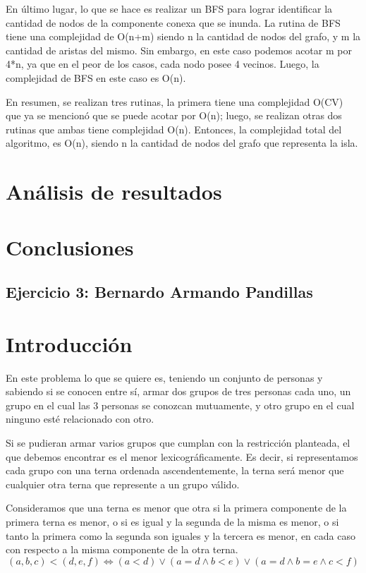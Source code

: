 \documentclass[a4paper, 12pt]{article}
\begin{document}
En \'ultimo lugar, lo que se hace es realizar un BFS para lograr identificar la cantidad de nodos de la componente conexa que se inunda. La rutina de BFS tiene una complejidad de O(n+m) siendo n la cantidad de nodos del grafo, y m la cantidad de aristas del mismo. Sin embargo, en este caso podemos acotar m por 4*n, ya que en el peor de los casos, cada nodo posee 4 vecinos. Luego, la complejidad de BFS en este caso es O(n).

En resumen, se realizan tres rutinas, la primera tiene una complejidad O(CV) que ya se mencion\'o que se puede acotar por O(n); luego, se realizan otras dos rutinas que ambas tiene complejidad O(n). Entonces, la complejidad total del algoritmo, es O(n), siendo n la cantidad de nodos del grafo que representa la isla.

\section*{An\'alisis de resultados}
\section*{Conclusiones}

\begin{center}
\item \section*{Ejercicio 3: Bernardo Armando Pandillas}
\end{center}

\section*{Introducci\'on}


En este problema lo que se quiere es, teniendo un conjunto de personas y sabiendo si se conocen entre s\'i, armar dos grupos de tres personas cada uno, un grupo en el cual las 3 personas se conozcan mutuamente, y otro grupo en el cual ninguno est\'e relacionado con otro.


Si se pudieran armar varios grupos que cumplan con la restricci\'on planteada, el que debemos encontrar es el menor lexicogr\'aficamente. Es decir, si representamos cada grupo con una terna ordenada ascendentemente, la terna ser\'a menor que cualquier otra terna que represente a un grupo v\'alido.

Consideramos que una terna es menor que otra si la primera componente de la primera terna es menor, o si es igual y la segunda de la misma es menor, o si tanto la primera como la segunda son iguales y la tercera es menor, en cada caso con respecto a la misma componente de la otra terna.
\begin{displaymath}
\left(a, b, c \right) < \left( d, e, f\right) \Leftrightarrow 
\left( a < d \right) \vee \left( a = d \wedge b < e \right) \vee \left( a = d \wedge b = e \wedge c < f \right)
\end{displaymath}
\end{document}
